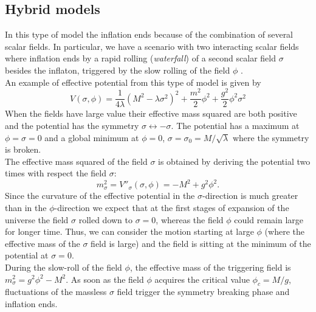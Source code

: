 \documentclass[11pt,a4paper,twoside]{book}
\begin{document}
\subsection{Hybrid models}
In this type of model the inflation ends because of the combination of several scalar fields. In particular, we have a scenario with two interacting scalar fields where inflation ends by a rapid rolling (\textit{waterfall}) of a second scalar field $\sigma$ besides the inflaton, triggered by the slow rolling of the field $\phi$ \cite{Chap2: Hybrid_Model}.\\
An example of effective potential from this type of model is given by
\begin{equation}
\label{Chap2:Hybrid model}
	V(\sigma,\phi) = \frac{1}{4\lambda}(M^{2}-\lambda \sigma^{2})^{2} + \frac{m^{2}}{2}\phi^{2} + \frac{g^{2}}{2}\phi^{2}\sigma^{2} 
\end{equation} 
When the fields have large value their effective mass squared are both positive and the potential has the symmetry $ \sigma \leftrightarrow -\sigma $. The potential has a maximum at $\phi = \sigma = 0$ and a global minimum at $\phi = 0$, $\sigma=\sigma_{0}=M/\sqrt{\lambda }$ where the symmetry is broken.\\
The effective mass squared of the field $\sigma$ is obtained by deriving the potential two times with respect the field $\sigma$:
\begin{equation}
	\label{massEffectiveSigma}
	m^{2}_{\sigma} = V''_{\sigma}(\sigma,\phi) = -M^{2} + g^{2}\phi^{2}.
\end{equation}
 Since the curvature of the effective potential in the $\sigma$-direction is much greater than in the $\phi$-direction we expect that at the first stages of expansion of the universe the field $\sigma$ rolled down to $\sigma=0$, whereas the field $\phi$ could remain large for longer time. Thus, we can consider the motion starting at large $\phi$ (where the effective mass of the $\sigma$ field is large) and the field is sitting at the minimum of the potential at $\sigma=0$.\\
 During the slow-roll of the field $\phi$, the effective mass of the triggering field is $ m^{2}_{\sigma} = g^{2}\phi^{2}-M^{2}$. As soon as the field $\phi$ acquires the critical value $\phi_{c}=M/g$, fluctuations of the massless $\sigma$ field trigger the symmetry breaking phase and inflation ends. \\
\end{document}
